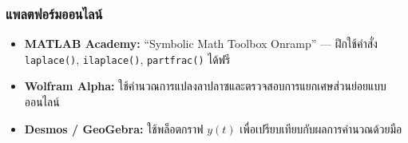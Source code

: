 \subsubsection{แพลตฟอร์มออนไลน์}\label{uxe41uxe1euxe25uxe15uxe1fuxe2duxe23uxe21uxe2duxe2duxe19uxe44uxe25uxe19}

\begin{itemize}
\tightlist
\item
  \textbf{MATLAB Academy:} ``Symbolic Math Toolbox Onramp'' --- ฝึกใช้คำสั่ง
  \texttt{laplace()}, \texttt{ilaplace()}, \texttt{partfrac()} ได้ฟรี
\item
  \textbf{Wolfram Alpha:}
  ใช้คำนวณการแปลงลาปลาซและตรวจสอบการแยกเศษส่วนย่อยแบบออนไลน์
\item
  \textbf{Desmos / GeoGebra:} ใช้พล็อตกราฟ \(y(t)\)
  เพื่อเปรียบเทียบกับผลการคำนวณด้วยมือ
\end{itemize}


